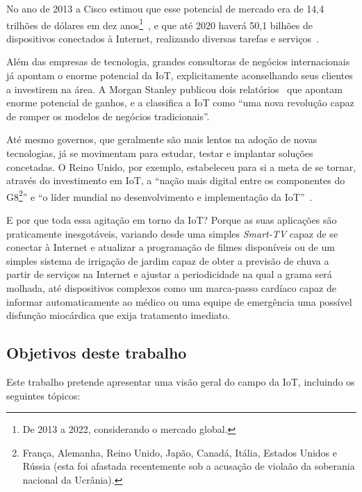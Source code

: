 \documentclass[pdftex, brazil, 12pt, twoside]{article}
\newcommand{\ingles}[1]{\textit{#1}}
\begin{document}
No ano de 2013 a Cisco estimou que esse potencial
de mercado era de 14,4 trilhões de dólares em dez anos\footnote{De 2013 a 2022, considerando
o mercado global.}~\citep{CiscoIoTFAQ2013},
e que até 2020 haverá 50,1 bilhões de dispositivos conectados à Internet,
realizando diversas tarefas e serviços~\citep{CiscoIoEConnectionsCounter}.

Além das empresas de tecnologia, grandes consultoras de negócios internacionais
já apontam o enorme potencial da IoT, explicitamente aconselhando
seus clientes a investirem na área.
A Morgan Stanley publicou dois relatórios~\citep{MorganStanleyIoTnow2013,MorganStanleyIoTpersonal2014}
que apontam enorme potencial de ganhos, e a \citet{OliverWymanIoT2015} classifica
a IoT como ``uma nova revolução capaz de romper os modelos de negócios tradicionais''.

Até mesmo governos, que geralmente são mais lentos na adoção de novas tecnologias, já
se movimentam para estudar, testar e implantar soluções concetadas. O Reino Unido,
por exemplo, estabeleceu para si a meta de se tornar, através do investimento em IoT,
a ``nação mais digital entre os componentes do G8\footnote{França, Alemanha, Reino Unido,
  Japão, Canadá, Itália, Estados Unidos e Rússia (esta foi afastada recentemente sob
  a acusação de violaão da soberania nacional da Ucrânia).}'' e 
``o líder mundial no desenvolvimento e implementação da IoT''~\citep{UKGOSWalportIoT2014}.

E por que toda essa agitação em torno da IoT? Porque as suas aplicações
são praticamente inesgotáveis, variando desde uma simples
\ingles{Smart-TV} capaz de se conectar à Internet e atualizar a programação de
filmes disponíveis ou de um simples sistema de irrigação de jardim capaz de
obter a previsão de chuva a partir de serviços na Internet e ajustar a periodicidade
na qual a grama será molhada, até dispositivos complexos como um marca-passo cardíaco
capaz de informar automaticamente ao médico ou uma equipe de emergência uma possível
disfunção miocárdica que exija tratamento imediato.


\subsection{Objetivos deste trabalho}
\label{intro-objetivos}

Este trabalho pretende apresentar uma visão geral do campo da IoT, incluindo os
seguintes tópicos:
\end{document}
